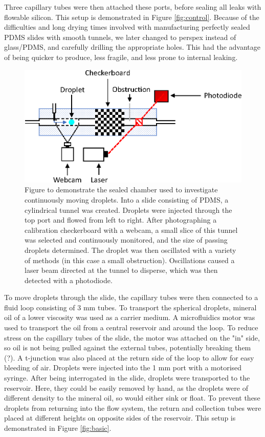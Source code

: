 \documentclass{physics_article_B}
\begin{document}
        Three capillary tubes were then attached these ports, before sealing all leaks with flowable silicon. This setup is demonstrated in Figure \ref{fig:control}. Because of the difficulties and long drying times involved with manufacturing perfectly sealed PDMS slides with smooth tunnels, we later changed to perspex instead of glass/PDMS, and carefully drilling the appropriate holes. This had the advantage of being quicker to produce, less fragile, and less prone to internal leaking. 
        
            \begin{figure}[H]
                \centering
                    \hspace*{2.4cm}\includegraphics[scale=0.9]{Figures/Control.eps}
                    \caption{Figure to demonstrate the sealed chamber used to investigate continuously moving droplets. Into a slide consisting of PDMS, a cylindrical tunnel was created. Droplets were injected through the top port and flowed from left to right. After photographing a calibration checkerboard with a webcam, a small slice of this tunnel was selected and continuously monitored, and the size of passing droplets determined. The droplet was then oscillated with a variety of methods (in this case a small obstruction). Oscillations caused a laser beam directed at the tunnel to disperse, which was then detected with a photodiode.} 
                \label{fig:slide}
            \end{figure} 
    
        To move droplets through the slide, the capillary tubes were then connected to a fluid loop consisting of 3 mm tubes. To transport the spherical droplets, mineral oil of a lower viscosity was used as a carrier medium. A microfluidics motor was used to transport the oil from a central reservoir and around the loop. To reduce stress on the capillary tubes of the slide, the motor was attached on the "in" side, so oil is not being pulled against the external tubes, potentially breaking them (?). A t-junction was also placed at the return side of the loop to allow for easy bleeding of air. Droplets were injected into the 1 mm port with a motorised syringe. After being interrogated in the slide, droplets were transported to the reservoir. Here, they could be easily removed by hand, as the droplets were of different density to the mineral oil, so would either sink or float. To prevent these droplets from returning into the flow system, the return and collection tubes were placed at different heights on opposite sides of the reservoir. This setup is demonstrated in Figure \ref{fig:basic}.
        
\end{document}
